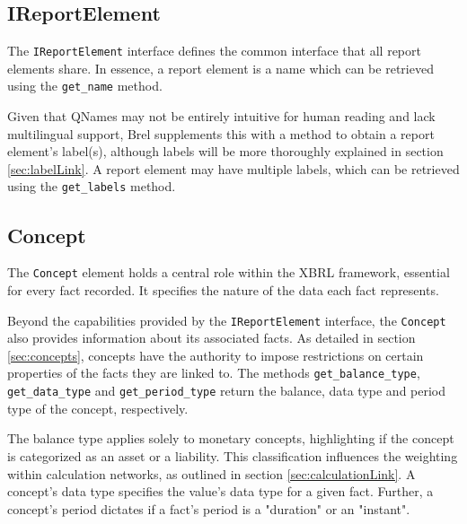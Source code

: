 \subsection{IReportElement}

The \texttt{IReportElement} interface defines the common interface that all report elements share.
In essence, a report element is a name which can be retrieved using the \texttt{get\_name} method.

Given that QNames may not be entirely intuitive for human reading and lack multilingual support, 
Brel supplements this with a method to obtain a report element's label(s), 
although labels will be more thoroughly explained in section \ref{sec:labelLink}. 
A report element may have multiple labels, which can be retrieved using the \texttt{get\_labels} method.

\subsection{Concept}

The \texttt{Concept} element holds a central role within the XBRL framework, essential for every fact recorded. 
It specifies the nature of the data each fact represents.

Beyond the capabilities provided by the \texttt{IReportElement} interface,
the \texttt{Concept} also provides information about its associated facts.
As detailed in section \ref{sec:concepts}, concepts have the authority to impose restrictions on certain properties of the facts they are linked to.
The methods \texttt{get\_balance\_type}, \texttt{get\_data\_type} and \texttt{get\_period\_type} return the balance, 
data type and period type of the concept, respectively.

The balance type applies solely to monetary concepts,
highlighting if the concept is categorized as an asset or a liability.
This classification influences the weighting within calculation networks, as outlined in section \ref{sec:calculationLink}.
A concept's data type specifies the value's data type for a given fact.
Further, a concept's period dictates if a fact's period is a "duration" or an "instant".

